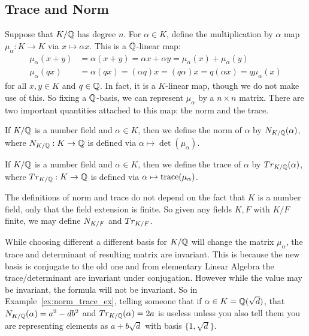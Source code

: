 \subsection{Trace and Norm}


Suppose that $K/\mathbb{Q}$ has degree $n$. For $\alpha \in K$, define the multiplication by $\alpha$ map $\mu_\alpha: K \to K$ via $x \mapsto \alpha x$. This is a $\mathbb{Q}$-linear map:
	\[
	\begin{split}
	\mu_\alpha(x+y)&= \alpha(x+y)= \alpha x + \alpha y= \mu_\alpha(x) + \mu_\alpha(y) \\
	\mu_\alpha(qx)&= \alpha(qx)= (\alpha q)x= (q\alpha)x= q(\alpha x)= q \mu_\alpha(x)
	\end{split}
	\]
for all $x,y \in K$ and $q \in \mathbb{Q}$.
In fact, it is a $K$-linear map, though we do not make use of this. So fixing a $\mathbb{Q}$-basis, we can represent $\mu_\alpha$ by a $n \times n$ matrix. There are two important quantities attached to this map: the norm and the trace. 


\begin{dfn}[Norm]
If $K/\mathbb{Q}$ is a number field and $\alpha \in K$, then we define the norm of $\alpha$ by $N_{K/\mathbb{Q}}(\alpha)$, where $N_{K/\mathbb{Q}}: K \to \mathbb{Q}$ is defined via $\alpha \mapsto \det(\mu_\alpha)$. 
\end{dfn}


\begin{dfn}[Trace]
If $K/\mathbb{Q}$ is a number field and $\alpha \in K$, then we define the trace of $\alpha$ by $Tr_{K/\mathbb{Q}}(\alpha)$, where $Tr_{K/\mathbb{Q}}: K \to \mathbb{Q}$ is defined via $\alpha \mapsto \operatorname{trace}(\mu_\alpha)$. 
\end{dfn}


\begin{rem}
The definitions of norm and trace do not depend on the fact that $K$ is a number field, only that the field extension is finite. So given any fields $K,F$ with $K/F$ finite, we may define $N_{K/F}$ and $Tr_{K/F}$. 
\end{rem}


\begin{rem}
While choosing different a different basis for $K/\mathbb{Q}$ will change the matrix $\mu_\alpha$, the trace and determinant of resulting matrix are invariant. This is because the new basis is conjugate to the old one and from elementary Linear Algebra the trace/determinant are invariant under conjugation. However while the value may be invariant, the formula will not be invariant. So in Example~\ref{ex:norm_trace_ex}, telling someone that if $\alpha \in K= \mathbb{Q}(\sqrt{d})$, that $N_{K/\mathbb{Q}}(\alpha)= a^2 - db^2$ and $Tr_{K/\mathbb{Q}}(\alpha)= 2a$ is useless unless you also tell them you are representing elements as $a + b\sqrt{d}$ with basis $\{ 1, \sqrt{d} \}$. 
\end{rem}


